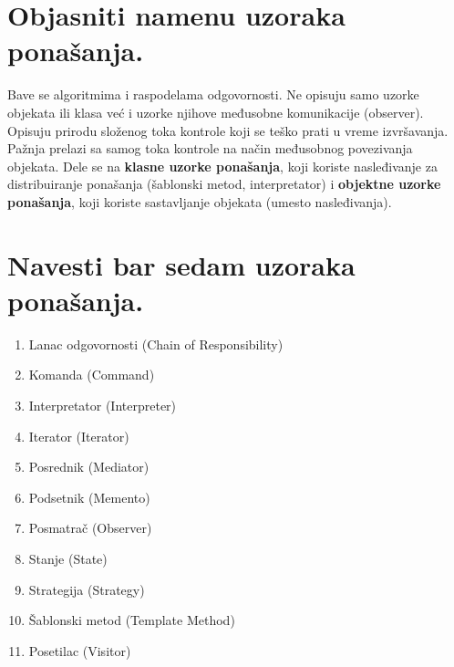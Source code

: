 \documentclass[a4paper]{article}
\begin{document}
\section{Objasniti namenu uzoraka ponašanja.}
  Bave se algoritmima i raspodelama odgovornosti. Ne opisuju samo uzorke objekata ili klasa
  već i uzorke njihove međusobne komunikacije (observer). Opisuju prirodu složenog toka kontrole
  koji se teško prati u vreme izvršavanja. Pažnja prelazi sa samog toka kontrole na način međusobnog
  povezivanja objekata. Dele se na \textbf{klasne uzorke ponašanja}, koji koriste nasleđivanje
  za distribuiranje ponašanja (šablonski metod, interpretator) i \textbf{objektne uzorke ponašanja},
  koji koriste sastavljanje objekata (umesto nasleđivanja).

\section{Navesti bar sedam uzoraka ponašanja.}
  \begin{enumerate}
    \item Lanac odgovornosti (Chain of Responsibility)
    \item Komanda (Command)
    \item Interpretator (Interpreter)
    \item Iterator (Iterator)
    \item Posrednik (Mediator)
    \item Podsetnik (Memento)
    \item Posmatrač (Observer)
    \item Stanje (State)
    \item Strategija (Strategy)
    \item Šablonski metod (Template Method)
    \item Posetilac (Visitor)
  \end{enumerate}
\end{document}
